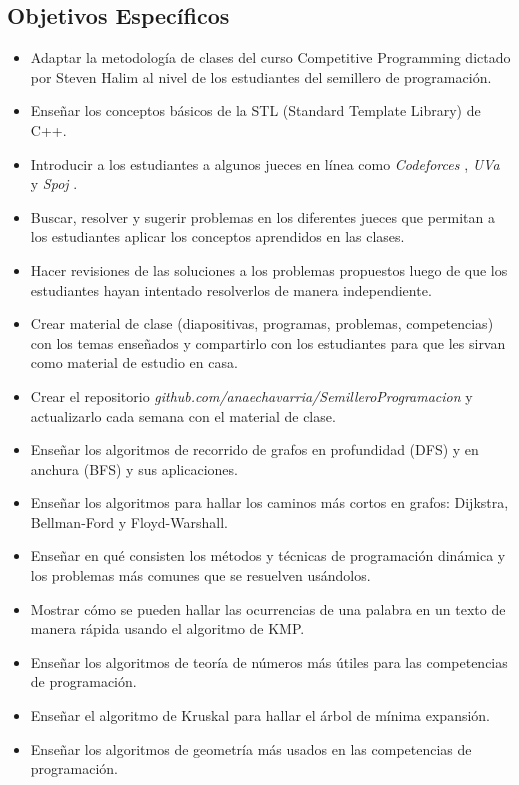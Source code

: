 \documentclass[11pt, oneside]{article}
\theoremstyle{definition}
\theoremstyle{remark}
\begin{document}
\subsection{Objetivos Específicos}
\begin{itemize}
	\item{Adaptar la metodología de clases del curso Competitive Programming dictado por Steven Halim \cite{CourseNUS} al nivel de los estudiantes del semillero de programación.}
	\item{Enseñar los conceptos básicos de la STL (Standard Template Library) de C++.}
	\item{Introducir a los estudiantes a algunos jueces en línea como \emph{Codeforces} \cite{Codeforces}, \emph{UVa} \cite{UVa} y \emph{Spoj} \cite{Spoj}.}
	\item{Buscar, resolver y sugerir problemas en los diferentes jueces que permitan a los estudiantes aplicar los conceptos aprendidos en las clases.}
	\item{Hacer revisiones de las soluciones a los problemas propuestos luego de que los estudiantes hayan intentado resolverlos de manera independiente.}
	\item{Crear material de clase (diapositivas, programas, problemas, competencias) con los temas enseñados y compartirlo con los estudiantes para que les sirvan como material de estudio en casa.}
	\item{Crear el repositorio \emph{github.com/anaechavarria/SemilleroProgramacion} y actualizarlo cada semana con el material de clase.}
	\item{Enseñar los algoritmos de recorrido de grafos en profundidad (DFS) y en anchura (BFS) y sus aplicaciones.}
	\item{Enseñar los algoritmos para hallar los caminos más cortos en grafos: Dijkstra, Bellman-Ford y Floyd-Warshall.}
	\item{Enseñar en qué consisten los métodos y técnicas de programación dinámica y los problemas más comunes que se resuelven usándolos.}
	\item{Mostrar cómo se pueden hallar las ocurrencias de una palabra en un texto de manera rápida usando el algoritmo de KMP.}
	\item{Enseñar los algoritmos de teoría de números más útiles \cite{ProgrammingChallenges, Halim, Halim2, Brasil} para las competencias de programación.}
	\item{Enseñar el algoritmo de Kruskal para hallar el árbol de mínima expansión.}
	\item{Enseñar los algoritmos de geometría más usados \cite{ProgrammingChallenges, Halim, Halim2, Brasil} en las competencias de programación.}
\end{itemize}
\end{document}
